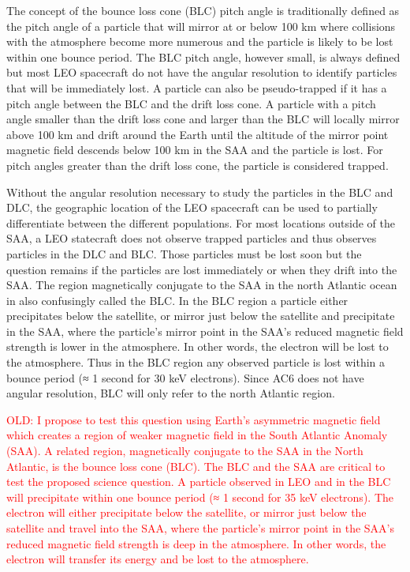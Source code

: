 \documentclass[draft]{agujournal2019}
\begin{document}
The concept of the bounce loss cone (BLC) pitch angle is traditionally defined as the pitch angle of a particle that will mirror at or below 100 km where collisions with the atmosphere become more numerous and the particle is likely to be lost within one bounce period. The BLC pitch angle, however small, is always defined but most LEO spacecraft do not have the angular resolution to identify particles that will be immediately lost. A particle can also be pseudo-trapped if it has a pitch angle between the BLC and the drift loss cone. A particle with a pitch angle smaller than the drift loss cone and larger than the BLC will locally mirror above 100 km and drift around the Earth until the altitude of the mirror point magnetic field descends below 100 km in the SAA and the particle is lost. For pitch angles greater than the drift loss cone, the particle is considered trapped.

Without the angular resolution necessary to study the particles in the BLC and DLC, the geographic location of the LEO spacecraft can be used to partially differentiate between the different populations. For most locations outside of the SAA, a LEO statecraft does not observe trapped particles and thus observes particles in the DLC and BLC. Those particles must be lost soon but the question remains if the particles are lost immediately or when they drift into the SAA. The region magnetically conjugate to the SAA in the north Atlantic ocean in also confusingly called the BLC. In the BLC region a particle either precipitates below the satellite, or mirror just below the satellite and precipitate in the SAA, where the particle’s mirror point in the SAA’s reduced magnetic field strength is lower in the atmosphere. In other words, the electron will be lost to the atmosphere. Thus in the BLC region any observed particle is lost within a bounce period (≈ 1 second for 30 keV electrons). Since AC6 does not have angular resolution, BLC will only refer to the north Atlantic region.

\textcolor{red}{OLD: I propose to test this question using Earth’s asymmetric magnetic field which creates a region of weaker magnetic field in the South Atlantic Anomaly (SAA). A related region, magnetically conjugate to the SAA in the North Atlantic, is the bounce loss cone (BLC). The BLC and the SAA are critical to test the proposed science question. A particle observed in LEO and in the BLC will precipitate within one bounce period (≈ 1 second for 35 keV electrons). The electron will either precipitate below the satellite, or mirror just below the satellite and travel into the SAA, where the particle’s mirror point in the SAA’s reduced magnetic field strength is deep in the atmosphere. In other words, the electron will transfer its energy and be lost to the atmosphere.}
\end{document}
